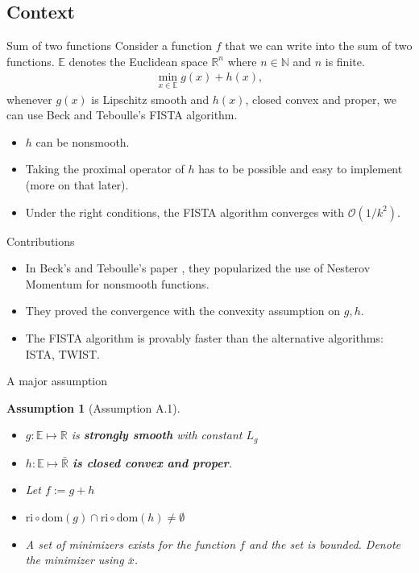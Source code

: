 \documentclass[11pt]{beamer}
\newtheorem{assumption}{Assumption}
\begin{document}
    \subsection{Context}
        \begin{frame}{Sum of two functions}
            Consider a function $f$ that we can write into the sum of two functions. $\mathbb E$ denotes the Euclidean space $\mathbb R^n$ where $n\in \mathbb N$ and $n$ is finite. 
            \begin{align}
                \min_{x\in \mathbb E} g(x) + h(x), 
            \end{align}  
            whenever $g(x)$ is Lipschitz smooth and $h(x)$, closed convex and proper, we can use Beck and Teboulle's FISTA algorithm. 
            \begin{itemize}
                \item [1.] $h$ can be nonsmooth. 
                \item [2.] Taking the proximal operator of $h$ has to be possible and easy to implement (more on that later).
                \item [3.] Under the right conditions, the FISTA algorithm converges with $\mathcal O(1/k^2)$. 
            \end{itemize}
        \end{frame}
        \begin{frame}{Contributions}
            \begin{itemize}
                \item [1.] In Beck's and Teboulle's paper \cite{paper:FISTA}, they popularized the use of Nesterov Momentum for nonsmooth functions. 
                \item [2.] They proved the convergence with the convexity assumption on $g, h$. 
                \item [3.] The FISTA algorithm is provably faster than the alternative algorithms: ISTA, TWIST. 
            \end{itemize}
        \end{frame}
        \begin{frame}{A major assumption}
            \begin{assumption}[Assumption A.1]\label{assumption:1}
                \begin{itemize}
                    \item [1] $g:\mathbb E\mapsto \mathbb R$ is \textbf{strongly smooth} with constant $L_g$
                    \item [2] $h:\mathbb E \mapsto \bar{\mathbb R}$ \textbf{is closed convex and proper}.
                    \item [3] Let $f := g + h$
                    \item [4] $\text{ri}\circ \text{dom}(g) \cap \text{ri}\circ \text{dom}(h) \neq \emptyset$
                    \item [5] A set of minimizers exists for the function $f$ and the set is bounded. Denote the minimizer using $\bar x$. 
                \end{itemize}
            \end{assumption}
        \end{frame}
\end{document}
